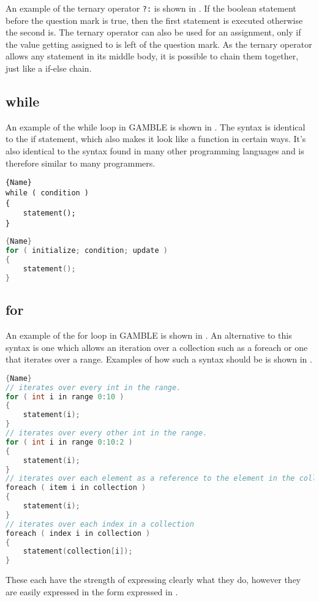 An example of the ternary operator \texttt{?:} is shown in . 
If the boolean statement before the question mark is true, then the first statement is executed otherwise the second is. 
The ternary operator can also be used for an assignment, only if the value getting assigned to is left of the question mark.
As the ternary operator allows any statement in its middle body, it is possible to chain them together, just like a if-else chain. 

\subsection{while}
An example of the while loop in GAMBLE is shown in . 
The syntax is identical to the if statement, which also makes it look like a function in certain ways. 
It's also identical to the syntax found in many other programming languages and is therefore similar to many programmers. 

\noindent\begin{minipage}{.40\textwidth}
\begin{lstlisting}[caption=A while loop in GAMBLE.,frame=tlrb, label=whilelst, numbers=none]{Name}
while ( condition )
{
    statement();
}
\end{lstlisting}
\end{minipage}\hfill
\begin{minipage}{.50\textwidth}
\begin{lstlisting}[caption=A for loop in GAMBLE.,frame=tlrb, label=forlst, numbers=none, language=C]{Name}
for ( initialize; condition; update )
{
    statement();
}
\end{lstlisting}
\end{minipage}

\subsection{for}
An example of the for loop in GAMBLE is shown in .
An alternative to this syntax is one which allows an iteration over a collection such as a foreach or one that iterates over a range.
Examples of how such a syntax should be is shown in .

\begin{lstlisting}[caption=Alternative syntaxes for the for loop.,frame=tlrb, label=forextlst, numbers=none, language=C]{Name}
// iterates over every int in the range.
for ( int i in range 0:10 )
{
    statement(i);
}
// iterates over every other int in the range.
for ( int i in range 0:10:2 )
{
    statement(i);
}
// iterates over each element as a reference to the element in the collection
foreach ( item i in collection )
{
    statement(i);
}
// iterates over each index in a collection
foreach ( index i in collection )
{
    statement(collection[i]);
}
\end{lstlisting}

These each have the strength of expressing clearly what they do, however they are easily expressed in the form expressed in .
